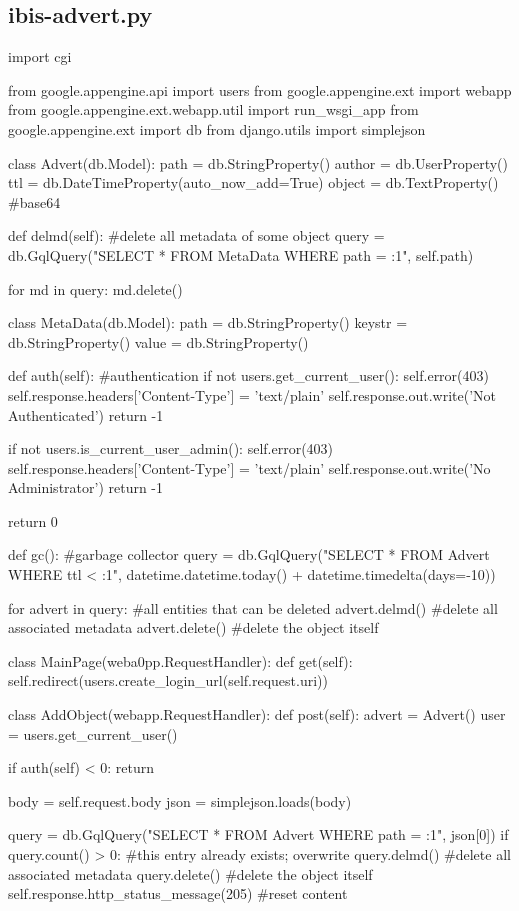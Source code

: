 \subsection{ibis-advert.py}
\begin{code}
import cgi

from google.appengine.api import users
from google.appengine.ext import webapp
from google.appengine.ext.webapp.util import run_wsgi_app
from google.appengine.ext import db
from django.utils import simplejson 

class Advert(db.Model):
  path   = db.StringProperty()
  author = db.UserProperty()
  ttl    = db.DateTimeProperty(auto_now_add=True)
  object = db.TextProperty() #base64
  
  def delmd(self): #delete all metadata of some object
    query = db.GqlQuery("SELECT * FROM MetaData WHERE path = :1", self.path)
    
    for md in query:
      md.delete()

class MetaData(db.Model):
  path   = db.StringProperty()
  keystr = db.StringProperty()
  value  = db.StringProperty()

def auth(self): #authentication
  if not users.get_current_user():
    self.error(403)
    self.response.headers['Content-Type'] = 'text/plain'
    self.response.out.write('Not Authenticated')
    return -1

  if not users.is_current_user_admin():
    self.error(403)
    self.response.headers['Content-Type'] = 'text/plain'
    self.response.out.write('No Administrator')
    return -1

  return 0

def gc(): #garbage collector
  query = db.GqlQuery("SELECT * FROM Advert WHERE ttl < :1", datetime.datetime.today() + datetime.timedelta(days=-10))
  
  for advert in query: #all entities that can be deleted
    advert.delmd()     #delete all associated metadata
    advert.delete()    #delete the object itself

class MainPage(weba0pp.RequestHandler):
  def get(self):
    self.redirect(users.create_login_url(self.request.uri))

class AddObject(webapp.RequestHandler):
  def post(self):
    advert = Advert()
    user   = users.get_current_user()
    
    if auth(self) < 0: return
    
    body = self.request.body
    json = simplejson.loads(body)
    
    query = db.GqlQuery("SELECT * FROM Advert WHERE path = :1", json[0])
    if query.count() > 0: #this entry already exists; overwrite
      query.delmd()  #delete all associated metadata
      query.delete() #delete the object itself
      self.response.http_status_message(205) #reset content
    

\end{code}
